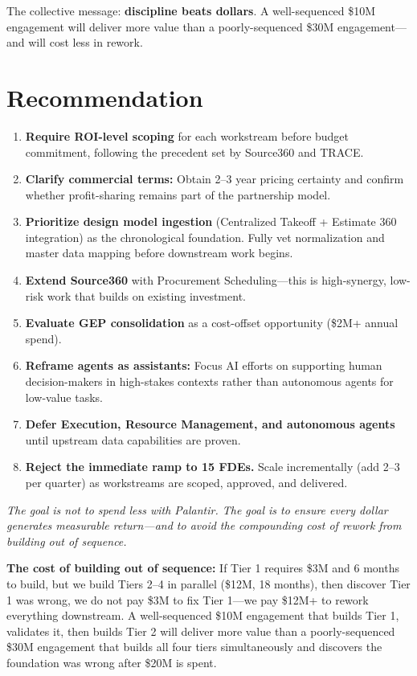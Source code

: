 \documentclass[11pt, letterpaper]{article}
\begin{document}
The collective message: \textbf{discipline beats dollars}. A well-sequenced \$10M engagement will deliver more value than a poorly-sequenced \$30M engagement---and will cost less in rework.

\vspace{1em}

\section*{Recommendation}

\begin{enumerate}
    \item \textbf{Require ROI-level scoping} for each workstream before budget commitment, following the precedent set by Source360 and TRACE.
    \item \textbf{Clarify commercial terms:} Obtain 2--3 year pricing certainty and confirm whether profit-sharing remains part of the partnership model.
    \item \textbf{Prioritize design model ingestion} (Centralized Takeoff + Estimate 360 integration) as the chronological foundation. Fully vet normalization and master data mapping before downstream work begins.
    \item \textbf{Extend Source360} with Procurement Scheduling---this is high-synergy, low-risk work that builds on existing investment.
    \item \textbf{Evaluate GEP consolidation} as a cost-offset opportunity (\$2M+ annual spend).
    \item \textbf{Reframe agents as assistants:} Focus AI efforts on supporting human decision-makers in high-stakes contexts rather than autonomous agents for low-value tasks.
    \item \textbf{Defer Execution, Resource Management, and autonomous agents} until upstream data capabilities are proven.
    \item \textbf{Reject the immediate ramp to 15 FDEs.} Scale incrementally (add 2--3 per quarter) as workstreams are scoped, approved, and delivered.
\end{enumerate}

\vspace{0.5em}

\textit{The goal is not to spend less with Palantir. The goal is to ensure every dollar generates measurable return---and to avoid the compounding cost of rework from building out of sequence.}

\textbf{The cost of building out of sequence:} If Tier 1 requires \$3M and 6 months to build, but we build Tiers 2--4 in parallel (\$12M, 18 months), then discover Tier 1 was wrong, we do not pay \$3M to fix Tier 1---we pay \$12M+ to rework everything downstream. A well-sequenced \$10M engagement that builds Tier 1, validates it, then builds Tier 2 will deliver more value than a poorly-sequenced \$30M engagement that builds all four tiers simultaneously and discovers the foundation was wrong after \$20M is spent.
\end{document}
